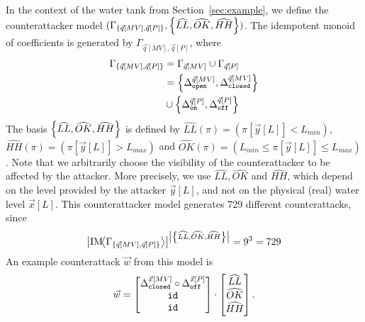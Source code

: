 {\begin{example}
  \label{ex:counterattack}
  In the context of the water tank from Section~\ref{sec:example}, we define the counterattacker model $(\Gamma_{\left\{\vec{q}[MV],\vec{q}[P]\right\}},\left\{\widehat{LL},\widehat{OK},\widehat{HH}\right\})$. The idempotent monoid of coefficients is generated by $\Gamma_{\vec{q}[MV],\vec{q}[P]}$, where 
  \begin{align*}
    \Gamma_{\left\{\vec{q}[MV],\vec{q}[P]\right\}}&=\Gamma_{\vec{q}[MV]}\cup\Gamma_{\vec{q}[P]}\\
    &=\left\{{\Delta}^{\vec{q}[MV]}_{\texttt{open}},{\Delta}^{\vec{q}[MV]}_{\texttt{closed}}\right\}\\
    &\cup \left\{{\Delta}^{\vec{q}[P]}_{\texttt{on}},{\Delta}^{\vec{q}[P]}_{\texttt{off}}\right\}
  \end{align*}
  The basis $\left\{\widehat{LL},\widehat{OK},\widehat{HH}\right\}$ is defined by  $\widehat{LL}(\pi)=(\pi[\vec{y}[L]]<L_{min})$, $\widehat{HH}(\pi)=(\pi[\vec{y}[L]]>L_{max})$ and $\widehat{OK}(\pi)=(L_{min}\leq \pi[\vec{y}[L]]\leq L_{max})$. Note that we arbitrarily choose the visibility of the counterattacker to be affected by the attacker. More precisely, we use $\widehat{LL},\widehat{OK}$ and $\widehat{HH}$, which depend on the level provided by the attacker $\vec{y}[L]$, and not on the physical (real) water level $\vec{x}[L]$. 
  This counterattacker model generates 729 different counterattacks, 
since
\begin{align*}
  \left| \text{IM}\!{{\left<\Gamma_{\left\{\vec{q}[MV],\vec{q}[P]\right\}}\right>}}\right|^{\left|\left\{\widehat{LL},\widehat{OK},\widehat{HH}\right\}\right|}=9^3=729
\end{align*}
  An example counterattack $\vec{w}$ from this model is 
  \begin{align}
    \vec{w}=
    \begin{bmatrix}
      {\Delta}^{\vec{x}[MV]}_{\texttt{closed}} \circ {\Delta}^{\vec{x}[P]}_{\texttt{off}} \\
      {\texttt{id}} \\
      {\texttt{id}}
    \end{bmatrix}
    \cdot
    \begin{bmatrix}
      \widehat{LL} \\
      \widehat{OK}\\
      \widehat{HH}
    \end{bmatrix}.
  \end{align}
\end{example}

}
